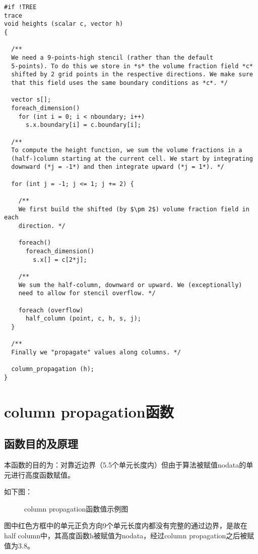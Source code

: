 \documentclass[lang=cn,11pt,a4paper]{elegantpaper}
\begin{document}
\begin{verbatim}
#if !TREE
trace
void heights (scalar c, vector h)
{

  /**
  We need a 9-points-high stencil (rather than the default
  5-points). To do this we store in *s* the volume fraction field *c*
  shifted by 2 grid points in the respective directions. We make sure
  that this field uses the same boundary conditions as *c*. */
  
  vector s[];
  foreach_dimension()
    for (int i = 0; i < nboundary; i++)
      s.x.boundary[i] = c.boundary[i];

  /**
  To compute the height function, we sum the volume fractions in a
  (half-)column starting at the current cell. We start by integrating
  downward (*j = -1*) and then integrate upward (*j = 1*). */
  
  for (int j = -1; j <= 1; j += 2) {

    /**
    We first build the shifted (by $\pm 2$) volume fraction field in each
    direction. */
    
    foreach()
      foreach_dimension()
        s.x[] = c[2*j];

    /**
    We sum the half-column, downward or upward. We (exceptionally)
    need to allow for stencil overflow. */

    foreach (overflow)
      half_column (point, c, h, s, j);
  }

  /**
  Finally we "propagate" values along columns. */
  
  column_propagation (h);
}
\end{verbatim}
\section{column propagation函数}
\subsection{函数目的及原理}
本函数的目的为：对靠近边界（5.5个单元长度内）但由于算法被赋值nodata的单元进行高度函数赋值。\par
如下图：
\begin{figure}[H]
    \centering
    \caption{column propagation函数值示例图}
\end{figure}
图中红色方框中的单元正负方向9个单元长度内都没有完整的通过边界，是故在half column中，其高度函数h被赋值为nodata，经过column propagation之后被赋值为3.8。
\end{document}
